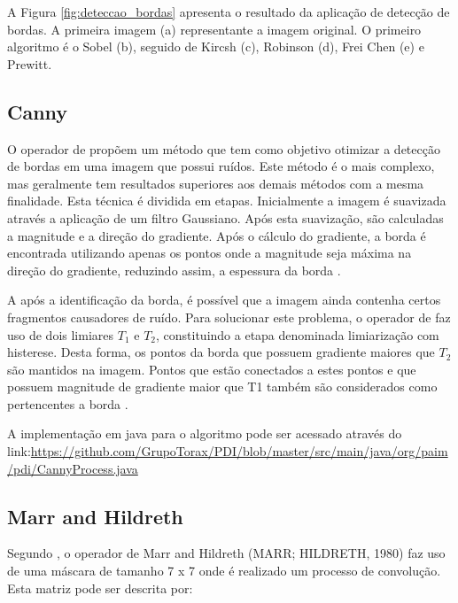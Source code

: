 \documentclass[
	12pt,				%
	oneside,			%
	a4paper,			%
	english,			%
	french,				%
	spanish,			%
	brazil,				%
	]{abntex2}
\begin{document}
A Figura \ref{fig:deteccao_bordas} apresenta o resultado da aplicação de detecção de bordas. A primeira imagem (a) representante a imagem original. O primeiro algoritmo é o Sobel (b), seguido de Kircsh (c), Robinson (d), Frei Chen (e) e Prewitt.

\subsection{Canny}

O operador de \citet{canny:1986} propõem um método que tem como objetivo otimizar a detecção de bordas em uma imagem que possui ruídos. Este método é o mais complexo, mas geralmente tem resultados superiores aos demais métodos com a mesma finalidade. Esta técnica é dividida em etapas. Inicialmente a imagem é suavizada através a aplicação de um filtro Gaussiano. Após esta suavização, são calculadas a magnitude e a direção do gradiente. Após o cálculo do gradiente, a borda é encontrada utilizando apenas os pontos onde a magnitude seja máxima na direção do gradiente, reduzindo assim, a espessura da borda \cite{pedriniSchwartz:2008}.

A após a identificação da borda, é possível que a imagem ainda contenha certos fragmentos causadores de ruído. Para solucionar este problema, o operador de \citet{canny:1986} faz uso de dois limiares \(T_1\) e \(T_2\), constituindo a etapa denominada limiarização com histerese. Desta forma, os pontos da borda que possuem gradiente maiores que \(T_2\) são mantidos na imagem. Pontos que estão conectados a estes pontos e que possuem magnitude de gradiente maior que T1 também são considerados como pertencentes a borda \cite{pedriniSchwartz:2008}.

A implementação em java para o algoritmo pode ser acessado através do link:\url{https://github.com/GrupoTorax/PDI/blob/master/src/main/java/org/paim/pdi/CannyProcess.java}

\subsection{Marr and Hildreth}
Segundo \citet{pedriniSchwartz:2008}, o operador de Marr and Hildreth (MARR; HILDRETH, 1980) faz uso de uma máscara de tamanho 7 x 7 onde é realizado um processo de convolução. Esta matriz pode ser descrita por:
\end{document}
